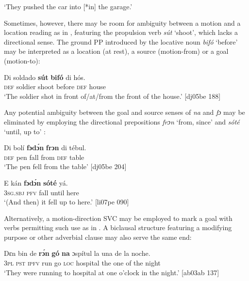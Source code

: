 \glt ‘They pushed the car into [*in] the garage.’ 
\z

Sometimes, however, there may be room for ambiguity between a motion and a location reading as in , featuring the propulsion verb \textit{sút} ‘shoot’, which lacks a directional sense. The ground PP introduced by the locative noun \textit{bifó} ‘before’ may be interpreted as a location (at rest), a source (motion-from) or a goal (motion-to): 


\ea%
    \label{ex:key:974}
    \gll Di  soldado  \textbf{sút}    \textbf{bifó}    di  hós.\\
\textsc{def}  soldier  shoot  before  \textsc{def}  house\\

\glt ‘The soldier shot in front of/at/from the front of the house.’ [dj05be 188]
\z

Any potential ambiguity between the goal and source senses of \textit{na} and \textit{fɔ} may be eliminated by employing the directional prepositions \textit{frɔn} ‘from, since’  and \textit{sóté} ‘until, up to’ :


\ea%
    \label{ex:key:975}
    \gll Di  bolí  \textbf{fɔdɔ́n}  \textbf{frɔn}    di  tébul.\\
\textsc{def}  pen  fall    from  \textsc{def}  table\\

\glt ‘The pen fell from the table’ [dj05be 204]
\z


\ea%
    \label{ex:key:976}
    \gll E    kán  \textbf{fɔdɔ́n}  \textbf{sóté}    yá.\\
\textsc{3sg.sbj}  \textsc{pfv}  fall    until  here\\

\glt ‘(And then) it fell up to here.’ [li07pe 090]
\z

Alternatively, a motion-direction SVC may be employed to mark a goal with verbs permitting such use as in . A biclausal structure featuring a modifying purpose or other adverbial clause may also serve the same end:


\ea%
    \label{ex:key:977}
    \gll Dɛn  bin  de  \textbf{rɔ́n}  \textbf{gó}  \textbf{na} ɔspítul  la  una  de  la  noche.\\
\textsc{3pl}  \textsc{pst}  \textsc{ipfv}  run  go  \textsc{loc}  hospital  the  one   of  the  night\\

\glt ‘They were running to hospital at one o’clock in the night.’ [ab03ab 137]
\z


